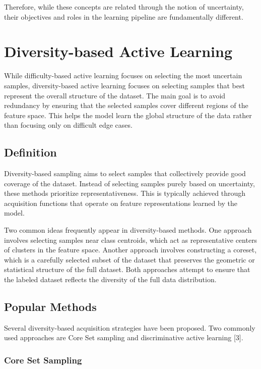 \documentclass{article}
\renewcommand{\cite}[1]{[#1]}
\begin{document}
Therefore, while these concepts are related through the notion of uncertainty, their objectives and roles in the learning pipeline are fundamentally different.

\section{Diversity-based Active Learning}

While difficulty-based active learning focuses on selecting the most uncertain samples, diversity-based active learning focuses on selecting samples that best represent the overall structure of the dataset. The main goal is to avoid redundancy by ensuring that the selected samples cover different regions of the feature space. This helps the model learn the global structure of the data rather than focusing only on difficult edge cases.

\subsection{Definition}

Diversity-based sampling aims to select samples that collectively provide good coverage of the dataset. Instead of selecting samples purely based on uncertainty, these methods prioritize representativeness. This is typically achieved through acquisition functions that operate on feature representations learned by the model.

Two common ideas frequently appear in diversity-based methods. One approach involves selecting samples near class centroids, which act as representative centers of clusters in the feature space. Another approach involves constructing a coreset, which is a carefully selected subset of the dataset that preserves the geometric or statistical structure of the full dataset. Both approaches attempt to ensure that the labeled dataset reflects the diversity of the full data distribution.

\subsection{Popular Methods}

Several diversity-based acquisition strategies have been proposed. Two commonly used approaches are Core Set sampling and discriminative active learning \cite{3}.

\subsubsection{Core Set Sampling}
\end{document}
